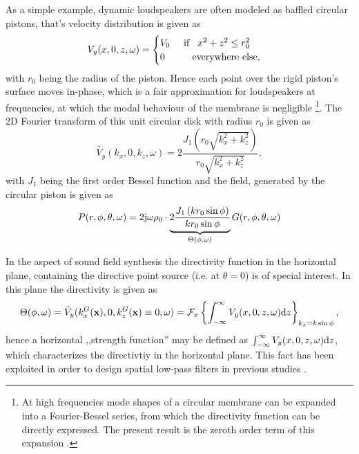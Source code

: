 \vspace{3mm}
As a simple example, dynamic loudspeakers are often modeled as baffled circular pistons, that's velocity distribution is given as
\begin{equation}
V_y(x,0,z,\omega) =
\begin{cases}
V_0  \hspace{5mm} \text{if} \hspace{3mm} x^2+z^2 \leq r_0^2\\ 
0 \hspace{10mm} \text{everywhere else},
\end{cases}
\end{equation} 
with $r_0$ being the radius of the piston.
Hence each point over the rigid piston's surface moves in-phase, which is a fair approximation for loudspeakers at frequencies, at which the modal behaviour of the membrane is negligible \footnote{At high frequencies mode shapes of a circular membrane can be expanded into a Fourier-Bessel series, from which the directivity function can be directly expressed. 
The present result is the zeroth order term of this expansion \cite{Williams1999}.}.
The 2D Fourier transform of this unit circular disk with radius $r_0$ is given as
\begin{equation}
\tilde{V_y}(k_x,0,k_z,\omega) = 2 \frac{J_1\left( r_0 \sqrt{k_x^2+k_z^2} \right)}{r_0 \sqrt{k_x^2+k_z^2}},
\end{equation}
with $J_1$ being the first order Bessel function and the field, generated by the circular piston is given as
\begin{equation}
P(r,\phi,\theta,\omega) = 
2 \mathrm{j} \omega \rho_0 \cdot \underbrace{2
\frac{J_1\left( k r_0 \sin \phi \right)}{k r_0 \sin \phi}
}_{\Theta(\phi,\omega)}
G(r,\phi,\theta,\omega)
\label{Eq:App_Circ_piston}
\end{equation}

In the aspect of sound field synthesis the directivity function in the horizontal plane, containing the directive point source (i.e. at $\theta=0$) is of special interest.
In this plane the directivity  is given as
\begin{equation}
\Theta(\phi,\omega) = \tilde{V}_{y}(k_x^G(\mathbf{x}),0,k_z^G(\mathbf{x}) \equiv 0 ,\omega) = \mathcal{F}_x\left\{ \int_{-\infty}^{\infty} V_y(x,0,z,\omega) \mathrm{d} z \right\}_{k_x = k \sin \phi},
\end{equation}
hence a horizontal ,,strength function'' may be defined as $\int_{-\infty}^{\infty} V_y(x,0,z,\omega) \mathrm{d} z$, which characterizes the directivtiy in the horizontal plane.
This fact has been exploited in order to design spatial low-pass filters in previous studies \cite{Verheijen1997}.